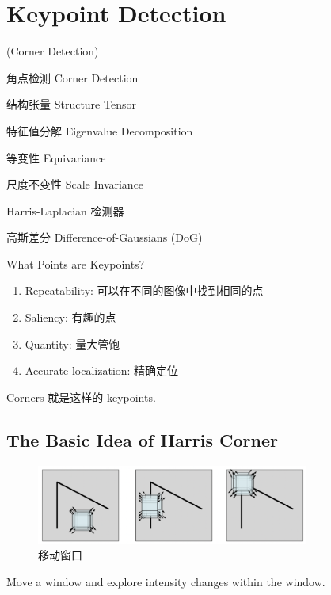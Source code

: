\chapter{Keypoint Detection}
(Corner Detection)

\begin{introduction}[Keywords]
    \item 角点检测 Corner Detection
    \item 结构张量 Structure Tensor
    \item 特征值分解 Eigenvalue Decomposition
    \item 等变性 Equivariance
    \item 尺度不变性 Scale Invariance
    \item Harris-Laplacian 检测器
    \item 高斯差分 Difference-of-Gaussians (DoG)
\end{introduction}

\begin{problem}
    What Points are Keypoints?
\end{problem}

\begin{enumerate}
    \item Repeatability: 可以在不同的图像中找到相同的点
    \item Saliency: 有趣的点
    \item Quantity: 量大管饱
    \item Accurate localization: 精确定位
\end{enumerate}
Corners 就是这样的 keypoints.




\section{The Basic Idea of Harris Corner}

\begin{figure}[htbp]
    \centering
    \includegraphics[width=0.8\textwidth]{figures/window_moving.png}
    \caption{移动窗口}    
\end{figure}

Move a window and explore intensity changes within the window.

